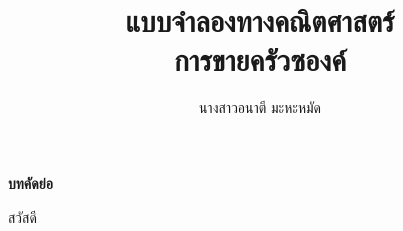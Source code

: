 \documentclass{report}
\title{แบบจำลองทางคณิตศาสตร์\\การขายครัวซองค์}
\author{นางสาวอนาตี มะหะหมัด}
\begin{document}
\maketitle
\tableofcontents
\listoftables
\listoffigures

\pagebreak

\begin{center}
\textbf{บทคัดย่อ } 
\end{center}

\setlength{\parindent}{20pt}สวัสดี
\end{document}
